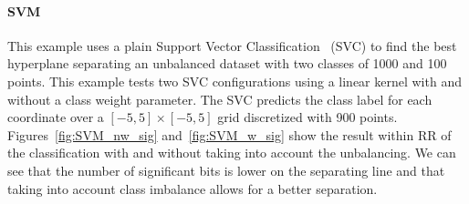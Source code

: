 \documentclass[11pt]{article}
\begin{document}
\paragraph{SVM}
This example uses a plain Support Vector Classification~\cite{Platt99probabilisticoutputs} (SVC) 
to find the best hyperplane separating an unbalanced dataset with two classes of 1000 and 100 points.
This example tests two SVC configurations using a linear kernel with and without a class weight parameter.
The SVC predicts the class label for each coordinate over a $[-5,5] \times [-5,5]$ grid discretized
with 900 points.
Figures~\ref{fig:SVM_nw_sig} and~\ref{fig:SVM_w_sig} show the result within RR of the classification with
and without taking into account the unbalancing.
We can see that the number of significant bits is lower on the separating line and
that taking into account class imbalance allows for a better separation.





\end{document}
